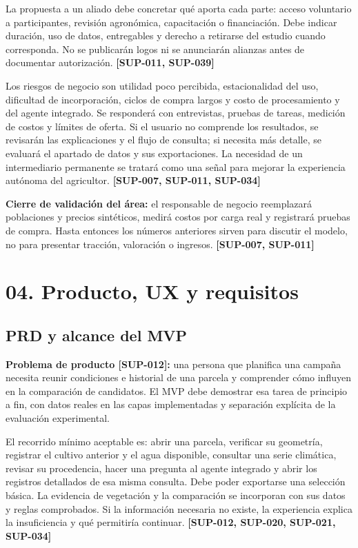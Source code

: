 \documentclass[10pt,a4paper]{article}
\begin{document}
La propuesta a un aliado debe concretar qué aporta cada parte: acceso voluntario a participantes, revisión agronómica, capacitación o financiación. Debe indicar duración, uso de datos, entregables y derecho a retirarse del estudio cuando corresponda. No se publicarán logos ni se anunciarán alianzas antes de documentar autorización. \textbf{[SUP-011, SUP-039]}


Los riesgos de negocio son utilidad poco percibida, estacionalidad del uso, dificultad de incorporación, ciclos de compra largos y costo de procesamiento y del agente integrado. Se responderá con entrevistas, pruebas de tareas, medición de costos y límites de oferta. Si el usuario no comprende los resultados, se revisarán las explicaciones y el flujo de consulta; si necesita más detalle, se evaluará el apartado de datos y sus exportaciones. La necesidad de un intermediario permanente se tratará como una señal para mejorar la experiencia autónoma del agricultor. \textbf{[SUP-007, SUP-011, SUP-034]}


\textbf{Cierre de validación del área:} el responsable de negocio reemplazará poblaciones y precios sintéticos, medirá costos por carga real y registrará pruebas de compra. Hasta entonces los números anteriores sirven para discutir el modelo, no para presentar tracción, valoración o ingresos. \textbf{[SUP-007, SUP-011]}


\clearpage\section{04. Producto, UX y requisitos}\label{04-producto-ux-y-requisitos}

\subsection{PRD y alcance del MVP}

\textbf{Problema de producto [SUP-012]:} una persona que planifica una campaña necesita reunir condiciones e historial de una parcela y comprender cómo influyen en la comparación de candidatos. El MVP debe demostrar esa tarea de principio a fin, con datos reales en las capas implementadas y separación explícita de la evaluación experimental.


El recorrido mínimo aceptable es: abrir una parcela, verificar su geometría, registrar el cultivo anterior y el agua disponible, consultar una serie climática, revisar su procedencia, hacer una pregunta al agente integrado y abrir los registros detallados de esa misma consulta. Debe poder exportarse una selección básica. La evidencia de vegetación y la comparación se incorporan con sus datos y reglas comprobados. Si la información necesaria no existe, la experiencia explica la insuficiencia y qué permitiría continuar. \textbf{[SUP-012, SUP-020, SUP-021, SUP-034]}
\end{document}
